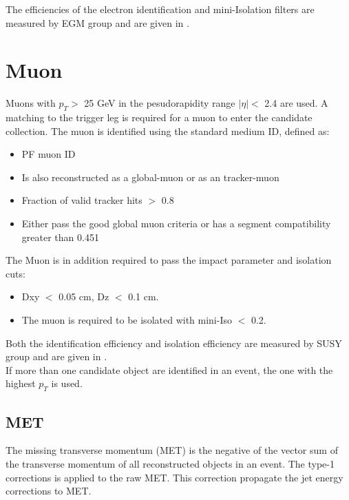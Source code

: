 \documentclass[thesis.tex]{subfiles}
\renewcommand\_{\textunderscore\allowbreak}
\begin{document}
The efficiencies of the electron identification and mini-Isolation filters are measured by EGM group and are given in \cite{EGM:leptonScale}.

\section{Muon}
Muons with $p_{T} >$ 25 GeV in the pesudorapidity range $|\eta| <$ 2.4 are used. A matching to the trigger leg is required for a muon to enter the candidate collection. The muon is identified using the standard medium ID, defined as:

\begin{center}
\begin{itemize}
\item PF muon ID
\item Is also reconstructed as a global-muon or as an tracker-muon
\item Fraction of valid tracker hits $>$ 0.8
\item Either pass the good global muon criteria or has a segment compatibility greater than 0.451
\end{itemize}
\end{center}

The Muon is in addition required to pass the impact parameter and isolation cuts:
\begin{center}
\begin{itemize}
\item Dxy $<$ 0.05 cm, Dz $<$ 0.1 cm.
\item The muon is required to be isolated with mini-Iso $<$ 0.2.
\end{itemize}
\end{center}

Both the identification efficiency and isolation efficiency are measured by SUSY group and are given in \cite{EGM:leptonScale}. \\

If more than one candidate object are identified in an event, the one with the highest $p_{T}$ is used.

\subsection{MET}
 The missing transverse momentum (MET) is the negative of the vector sum of the transverse momentum of all reconstructed objects in an event. The type-1 corrections is applied to the raw MET. This correction propagate the jet energy corrections to MET.  \\
\end{document}
